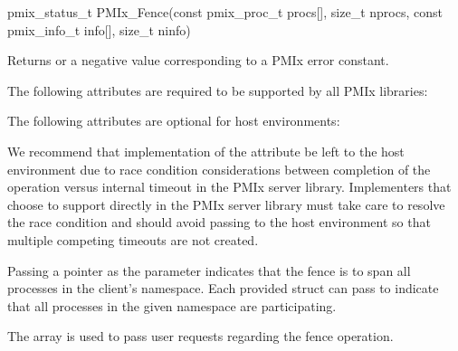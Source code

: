 \format

\cspecificstart
\begin{codepar}
pmix_status_t
PMIx_Fence(const pmix_proc_t procs[], size_t nprocs,
           const pmix_info_t info[], size_t ninfo)
\end{codepar}
\cspecificend

\begin{arglist}
\end{arglist}

Returns  or a negative value corresponding to a PMIx error constant.

\reqattrstart
The following attributes are required to be supported by all \ac{PMIx} libraries:


\reqattrend

\optattrstart
The following attributes are optional for host environments:


\optattrend

\adviceimplstart
We recommend that implementation of the  attribute be left to the host environment due to race condition considerations between completion of the operation versus internal timeout in the \ac{PMIx} server library. Implementers that choose to support  directly in the \ac{PMIx} server library must take care to resolve the race condition and should avoid passing  to the host environment so that multiple competing timeouts are not created.
\adviceimplend

\descr

Passing a  pointer as the  parameter indicates that the fence is to span all processes in the client's namespace.
Each provided  struct can pass  to indicate that all processes in the given namespace are participating.

The  array is used to pass user requests regarding the fence operation.

